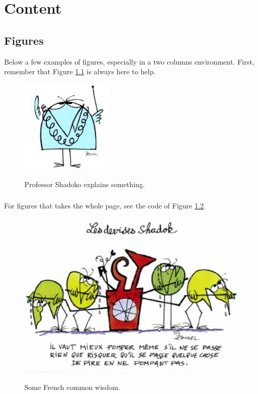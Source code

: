 \chapter{Content}
    \section{Figures}
        Below a few examples of figures, especially in a two columns environment.
        First, remember that Figure \ref{fig:intro:shadoko} is always here to help.

        \begin{figure}[h]
            \centering
            \includegraphics[width=0.4\textwidth]{figure/intro/shadoko}
            \label{fig:intro:shadoko}
            \caption{Professor Shadoko explains something.\cite{denis2012de}}
        \end{figure}

        \subsection{}
            For figures that takes the whole page, see the code of Figure \ref{fig:intro:widsom}.
            \begin{figure}[h]
                \centering
                \includegraphics[width=1\textwidth]{figure/intro/wisdom}
                \label{fig:intro:widsom}
                \caption{Some French common wisdom.}
            \end{figure}

